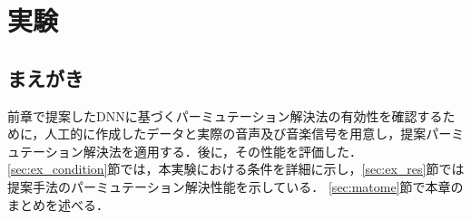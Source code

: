 \chapter{実験}
\label{chap:ex}

\section{まえがき}
前章で提案したDNNに基づくパーミュテーション解決法の有効性を確認するために，人工的に作成したデータと実際の音声及び音楽信号を用意し，提案パーミュテーション解決法を適用する．後に，その性能を評価した．
\ref{sec:ex_condition}節では，本実験における条件を詳細に示し，\ref{sec:ex_res}節では提案手法のパーミュテーション解決性能を示している．
\ref{sec:matome}節で本章のまとめを述べる．

